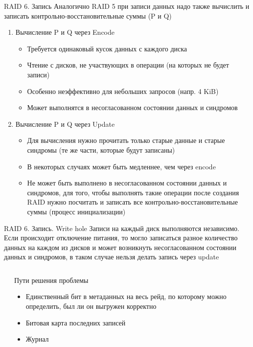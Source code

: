 \documentclass[aspectratio=169]{beamer}
\begin{document}
\begin{frame}{RAID 6. Запись}
Аналогично RAID 5 при записи данных надо также вычислить и записать контрольно-восстановительные суммы (P и Q)
\begin{enumerate}
    \item Вычисление P и Q через Encode
    \begin{itemize}
        \item Требуется одинаковый кусок данных с каждого диска
        \item Чтение с дисков, не участвующих в операции (на которых не будет записи)
        \item Особенно неэффективно для небольших запросов (напр. 4 KiB)
        \item Может выполнятся в несогласованном состоянии данных и синдромов
    \end{itemize}
    \item Вычисление P и Q через Update
    \begin{itemize}
        \item Для вычисления нужно прочитать только старые данные и старые синдромы (те же части, которые будут записаны)    
        \item В некоторых случаях может быть медленнее, чем через encode
        \item Не может быть выполнено в несогласованном состоянии данных и синдромов, для того, чтобы выполнять такие операции после создания RAID нужно посчитать и записать все контрольно-восстановительные суммы (процесс инициализации)
    \end{itemize}
\end{enumerate}
\end{frame}

\begin{frame}{RAID 6. Запись. Write hole}
    Записи на каждый диск выполняются независимо. Если происходит отключение питания, то могло записаться разное количество данных на каждом из дисков и может возникнуть несогласованном состоянии данных и синдромов, в таком случае нельзя делать запись через update
    \begin{columns}
        \begin{column}{.54\textwidth}
            \writehole
        \end{column}
        \begin{column}{.42\textwidth}
        
        \vspace{1em}
        Пути решения проблемы
            \begin{itemize}
                \item Единственный бит в метаданных на весь рейд, по которому можно определить, был ли он выгружен корректно
                \item Битовая карта последних записей
                \item Журнал
            \end{itemize}
        \end{column}
    \end{columns}
    
\end{frame}
\end{document}
